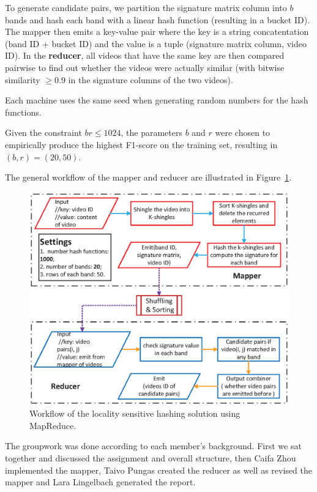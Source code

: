 \documentclass[a4paper, 11pt]{article}
\begin{document}
To generate candidate pairs, we partition the signature matrix column into $b$ bands and hash each band with a linear hash function (resulting in a bucket ID). The mapper then emits a key-value pair where the key is a string concatentation (band ID + bucket ID) and the value is a tuple (signature matrix column, video ID). In the \textbf{reducer}, all videos that have the same key are then compared pairwise to find out whether the videos were actually similar (with bitwise similarity $\geq 0.9$ in the signature columns of the two videos).

Each machine uses the same seed when generating random numbers for the hash functions.

Given the constraint $ br \leq 1024 $, the parameters $b$ and $r$ were chosen to empirically produce the highest F1-score on the training set, resulting in $(b, r)=(20, 50)$.

The general workflow of the mapper and reducer are illustrated in Figure~\ref{fig: Digraph}. 

\begin{figure}[!htb]
\centering
\includegraphics[scale=.7]{workflow_project_1.eps}
\caption{Workflow of the locality sensitive hashing solution using MapReduce.}
\label{fig: Digraph}
\end{figure}

The groupwork was done according to each member's background. First we sat together and discussed the assignment and overall structure, then Caifa Zhou implemented the mapper, Taivo Pungas created the reducer as well as revised the mapper and Lara Lingelbach generated the report. 
\end{document}
